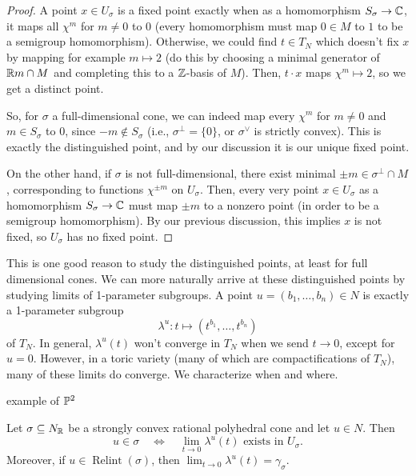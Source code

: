 \documentclass[12pt]{article}
\DeclareMathOperator{\Relint}{Relint}
\begin{document}
\begin{proof}
    A point $x\in U_\sigma$ is a fixed point exactly when as a homomorphism $S_\sigma \to \C$, it maps all $\chi^m$ for $m\neq 0$ to $0$ (every homomorphism must map $0\in M$ to $1$ to be a semigroup homomorphism). Otherwise, we could find $t\in T_N$ which doesn't fix $x$ by mapping for example $m\mapsto 2$ (do this by choosing a minimal generator of $\R m \cap M$ and completing this to a $\Z$-basis of $M$). Then, $t\cdot x$ maps $\chi^m \mapsto 2$, so we get a distinct point.

    So, for $\sigma$ a full-dimensional cone, we can indeed map every $\chi^m$ for $m\neq 0$ and $m\in S_\sigma$ to $0$, since $-m\not\in S_\sigma$ (i.e., $\sigma^\perp = \{0\}$, or $\sigma^\vee$ is strictly convex). This is exactly the distinguished point, and by our discussion it is our unique fixed point.
    
    On the other hand, if $\sigma$ is not full-dimensional, there exist minimal $\pm m\in \sigma^\perp\cap M$, corresponding to functions $\chi^{\pm m}$ on $U_\sigma$. Then, every very point $x\in U_\sigma$ as a homomorphism $S_\sigma \to \C$ must map $\pm m$ to a nonzero point (in order to be a semigroup homomorphism). By our previous discussion, this implies $x$ is not fixed, so $U_\sigma$ has no fixed point.
\end{proof}

This is one good reason to study the distinguished points, at least for full dimensional cones. We can more naturally arrive at these distinguished points by studying limits of 1-parameter subgroups. A point $u=(b_1,\dots,b_n)\in N$ is exactly a 1-parameter subgroup
\[\lambda^u: t \mapsto (t^{b_1},\dots,t^{b_n})\]
of $T_N$. In general, $\lambda^u(t)$ won't converge in $T_N$ when we send $t\to 0$, except for $u=0$. However, in a toric variety (many of which are compactifications of $T_N$), many of these limits do converge. We characterize when and where.

{\color{red} example of $\P^2$}

\begin{prop}
    Let $\sigma\subseteq N_\R$ be a strongly convex rational polyhedral cone and let $u\in N$. Then
    \[u\in \sigma \quad \iff \quad \lim_{t\to 0} \lambda^u(t) \text{ exists in $U_\sigma$}.\]
    Moreover, if $u\in \Relint(\sigma)$, then $\lim_{t\to 0}\lambda^u(t) = \gamma_\sigma$.
\end{prop}
\end{document}
